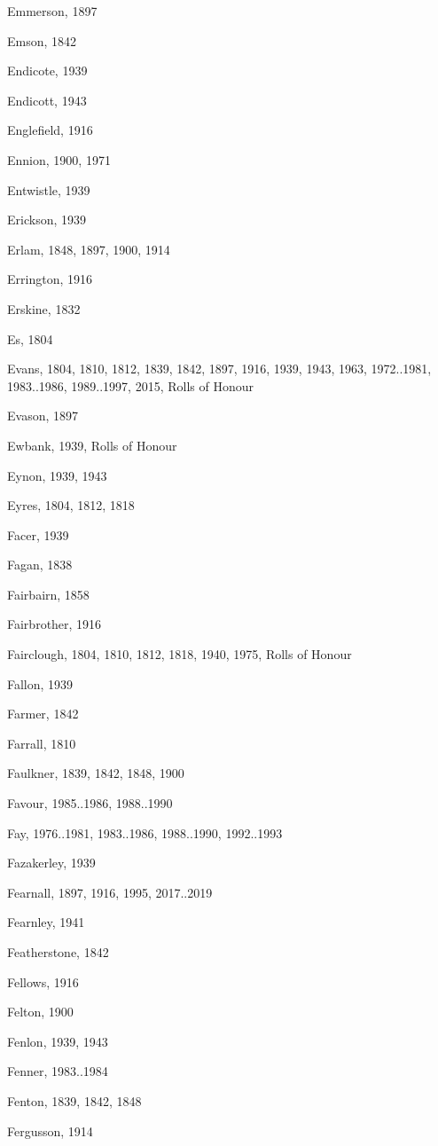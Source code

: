 \begin{theindex}
\item Emmerson, 1897
\item Emson, 1842
\item Endicote, 1939
\item Endicott, 1943
\item Englefield, 1916
\item Ennion, 1900, 1971
\item Entwistle, 1939
\item Erickson, 1939
\item Erlam, 1848, 1897, 1900, 1914
\item Errington, 1916
\item Erskine, 1832
\item Es, 1804
\item Evans, 1804, 1810, 1812, 1839, 1842, 1897, 1916, 1939, 1943, 1963, 1972..1981, 1983..1986, 1989..1997, 2015, Rolls of Honour
\item Evason, 1897
\item Ewbank, 1939, Rolls of Honour
\item Eynon, 1939, 1943
\item Eyres, 1804, 1812, 1818
\item Facer, 1939
\item Fagan, 1838
\item Fairbairn, 1858
\item Fairbrother, 1916
\item Fairclough, 1804, 1810, 1812, 1818, 1940, 1975, Rolls of Honour
\item Fallon, 1939
\item Farmer, 1842
\item Farrall, 1810
\item Faulkner, 1839, 1842, 1848, 1900
\item Favour, 1985..1986, 1988..1990
\item Fay, 1976..1981, 1983..1986, 1988..1990, 1992..1993
\item Fazakerley, 1939
\item Fearnall, 1897, 1916, 1995, 2017..2019
\item Fearnley, 1941
\item Featherstone, 1842
\item Fellows, 1916
\item Felton, 1900
\item Fenlon, 1939, 1943
\item Fenner, 1983..1984
\item Fenton, 1839, 1842, 1848
\item Fergusson, 1914

\end{theindex}
